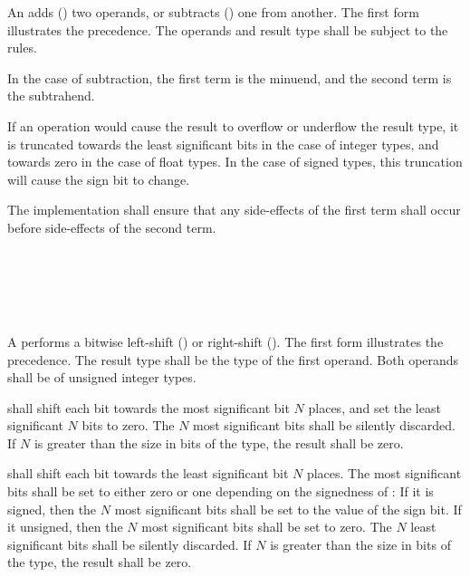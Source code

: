 \specsubsubitem
An  adds (\terminal{+}) two operands, or
subtracts (\terminal{-}) one from another. The first form illustrates the
precedence. The operands and result type shall be subject to the  rules.

\specsubsubitem
In the case of subtraction, the first term is the minuend, and the second term
is the subtrahend.

\specsubsubitem
If an operation would cause the result to overflow or underflow the result
type, it is truncated towards the least significant bits in the case of integer
types, and towards zero in the case of float types. In the case of signed
types, this truncation will cause the sign bit to change.

\specsubsubitem
The implementation shall ensure that any side-effects of the first term shall
occur before side-effects of the second term.


\begin{grammar}
 \\
	 \\
	 \terminal{\textless{}\textless{}}  \\
	 \terminal{\textgreater{}\textgreater{}}  \\
\end{grammar}

\specsubsubitem
A  performs a bitwise left-shift
(\terminal{\textless{}\textless{}}) or right-shift (\terminal{\textgreater{}\textgreater{}}). The first
form illustrates the precedence. The result type shall be the type of the first
operand. Both operands shall be of unsigned integer types.

\specsubsubitem
{} shall shift
each bit towards the most significant bit $N$ places, and set the least
significant $N$ bits to zero. The $N$ most significant bits shall be silently
discarded. If $N$ is greater than the size in bits of the type, the result shall
be zero.

\specsubsubitem
{} shall shift each bit towards the least significant bit $N$ places. The most
significant bits shall be set to either zero or one depending on the signedness
of : If it is signed, then the $N$ most
significant bits shall be set to the value of the sign bit. If it unsigned, then
the $N$ most significant bits shall be set to zero. The $N$ least significant
bits shall be silently discarded. If $N$ is greater than the size in bits of the
type, the result shall be zero.

